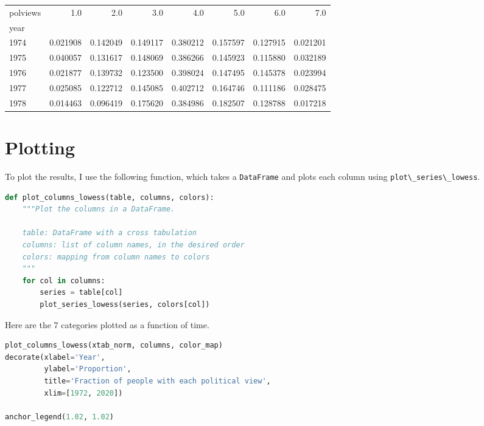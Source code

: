 \begin{tabular}{lrrrrrrr}
\toprule
polviews &       1.0 &       2.0 &       3.0 &       4.0 &       5.0 &       6.0 &       7.0 \\
year &           &           &           &           &           &           &           \\
\midrule
1974 &  0.021908 &  0.142049 &  0.149117 &  0.380212 &  0.157597 &  0.127915 &  0.021201 \\
1975 &  0.040057 &  0.131617 &  0.148069 &  0.386266 &  0.145923 &  0.115880 &  0.032189 \\
1976 &  0.021877 &  0.139732 &  0.123500 &  0.398024 &  0.147495 &  0.145378 &  0.023994 \\
1977 &  0.025085 &  0.122712 &  0.145085 &  0.402712 &  0.164746 &  0.111186 &  0.028475 \\
1978 &  0.014463 &  0.096419 &  0.175620 &  0.384986 &  0.182507 &  0.128788 &  0.017218 \\
\bottomrule
\end{tabular}

\hypertarget{plotting}{%
\section{Plotting}\label{plotting}}

To plot the results, I use the following function, which takes a
\passthrough{\lstinline!DataFrame!} and plots each column using
\passthrough{\lstinline!plot\_series\_lowess!}.

\begin{lstlisting}[language=Python]
def plot_columns_lowess(table, columns, colors):
    """Plot the columns in a DataFrame.
    
    table: DataFrame with a cross tabulation
    columns: list of column names, in the desired order
    colors: mapping from column names to colors
    """
    for col in columns:
        series = table[col]
        plot_series_lowess(series, colors[col])
\end{lstlisting}

Here are the 7 categories plotted as a function of time.

\begin{lstlisting}[language=Python]
plot_columns_lowess(xtab_norm, columns, color_map)
decorate(xlabel='Year',
         ylabel='Proportion',
         title='Fraction of people with each political view',
         xlim=[1972, 2020])

anchor_legend(1.02, 1.02)
\end{lstlisting}


